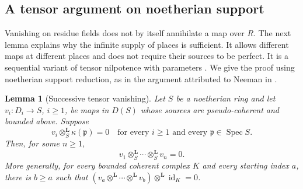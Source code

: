 \documentclass[11pt]{article}
\numberwithin{equation}{section}
\newtheorem{lemma}[theorem]{Lemma}
\theoremstyle{definition}
\theoremstyle{remark}
\newcommand{\Spec}{\operatorname{Spec}}
\newcommand{\id}{\operatorname{id}}
\begin{document}
\subsection{A tensor argument on noetherian support}

Vanishing on residue fields does not by itself annihilate a map over
$R$.  The next lemma explains why the infinite supply of places is
sufficient.  It allows different maps at different places and does not
require their sources to be perfect.  It is a sequential variant of
tensor nilpotence with parameters
\cite[Theorem~3.8]{Boundary:Thomason1997}.  We give the proof using
noetherian support reduction, as in the argument attributed to Neeman
in \cite[Sections~3.6.5--3.6.7 and History~3.17]{Boundary:Thomason1997}.

\begin{lemma}[Successive tensor vanishing]\label{lem:tensor-nilpotence}
Let $S$ be a noetherian ring and let
$v_i:D_i\to S$, $i\geq1$, be maps in $D(S)$ whose sources are
pseudo-coherent and bounded above.  Suppose
\[
 v_i\otimes_S^{\mathbf L}\kappa(\mathfrak p)=0
 \quad\text{for every }i\geq1\text{ and every }\mathfrak p\in\Spec S.
\]
Then, for some $n\geq1$,
\begin{equation}\label{boundary:tensor-zero}
 v_1\otimes_S^{\mathbf L}\cdots\otimes_S^{\mathbf L}v_n=0.
\end{equation}
More generally, for every bounded coherent complex $K$ and every
starting index $a$, there is $b\geq a$ such that
$(v_a\otimes^{\mathbf L}\cdots\otimes^{\mathbf L}v_b)
 \otimes^{\mathbf L}\id_K=0$.
\end{lemma}
\end{document}
